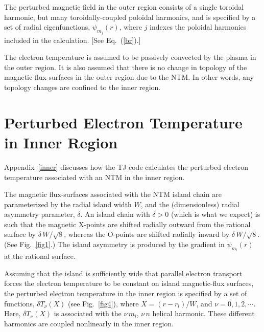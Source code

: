 \documentclass{iopjournal}
\begin{document}
{The perturbed magnetic field in the outer region consists of a single toroidal harmonic, but many toroidally-coupled poloidal
harmonics, and is specified by a set of radial eigenfunctions, $\psi_{m_j}(r)$, where $j$ indexes the poloidal harmonics included
in the calculation. [See Eq.~(\ref{br}).]

The electron temperature is assumed to be passively convected by the plasma in the outer region. It is also assumed that there is
no change in topology of the magnetic flux-surfaces in the outer region due to the NTM. In other words, any topology changes are
confined to  the inner region. 

\section{Perturbed Electron Temperature  in Inner Region}\label{s4}
Appendix~\ref{inner} discusses how the TJ code calculates the perturbed electron temperature associated with an NTM in the inner region.

The magnetic flux-surfaces associated with the NTM island chain are parameterized by the radial island width $W$, and the (dimensionless) radial
asymmetry parameter, $\delta$. An island chain with $\delta>0$ (which is what we expect) is such that the magnetic X-points are shifted
radially outward from the rational surface by $\delta\,W/\sqrt{8}$, whereas the O-points are shifted radially inward by $\delta\,W/\sqrt{8}$. (See Fig.~\ref{fig1}.) The island asymmetry is produced
by the gradient in $\psi_{m_l}(r)$ at the rational surface. 

Assuming that the island is sufficiently wide that parallel electron transport forces the electron temperature to be constant on island
magnetic-flux surfaces, the perturbed electron temperature in the inner region is specified by a set of functions, $\delta T_\nu(X)$ (see Fig.~\ref{fig4}), where
$X=(r-r_l)/W$, and $\nu=0,1,2,\cdots$. Here, $\delta T_\nu(X)$ is associated with the $\nu\,m_l$, $\nu\,n$ helical harmonic. These different harmonics
are coupled nonlinearly in the inner region. 

}
\end{document}
